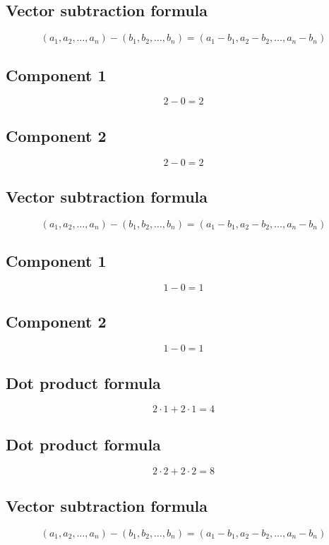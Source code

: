 \documentclass{article}
\begin{document}
\subsection*{ \vspace{1em} Vector subtraction formula}
\[
(a_1, a_2, \dots, a_n) - (b_1, b_2, \dots, b_n) = (a_1 - b_1, a_2 - b_2, \dots, a_n - b_n)
\]
\subsection*{ \vspace{1em} Component 1}
\[
2 - 0 = 2
\]
\subsection*{ \vspace{1em} Component 2}
\[
2 - 0 = 2
\]
\subsection*{ \vspace{1em} Vector subtraction formula}
\[
(a_1, a_2, \dots, a_n) - (b_1, b_2, \dots, b_n) = (a_1 - b_1, a_2 - b_2, \dots, a_n - b_n)
\]
\subsection*{ \vspace{1em} Component 1}
\[
1 - 0 = 1
\]
\subsection*{ \vspace{1em} Component 2}
\[
1 - 0 = 1
\]
\subsection*{ \vspace{1em} Dot product formula}
\[
2 \cdot 1 + 2 \cdot 1 = 4
\]
\subsection*{ \vspace{1em} Dot product formula}
\[
2 \cdot 2 + 2 \cdot 2 = 8
\]
\subsection*{ \vspace{1em} Vector subtraction formula}
\[
(a_1, a_2, \dots, a_n) - (b_1, b_2, \dots, b_n) = (a_1 - b_1, a_2 - b_2, \dots, a_n - b_n)
\]
\end{document}
